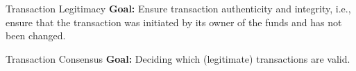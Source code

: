 \documentclass[]{beamer}
\begin{document}
\begin{frame}{Transaction Legitimacy}
\textbf{Goal:} Ensure transaction \color{focus}authenticity \color{black}and \color{focus} integrity\color{black}, i.e., ensure that the transaction was initiated by its owner of the funds and has not been changed.
\uncover<2->{
		\center
		
		}
\uncover<3->{
		\vspace{2em}
		
	}
\end{frame}


\begin{frame}{Transaction Consensus}
\textbf{Goal: }Deciding which (legitimate) transactions are valid. \\
\vspace{1em}
\end{frame}
\end{document}

